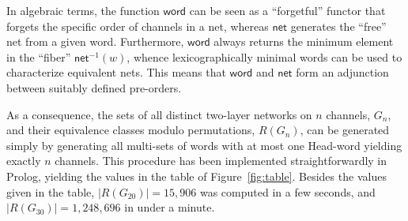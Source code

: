\documentclass[10pt]{IEEEtran}
\newcommand{\net}{\mathsf{net}}
\newcommand{\word}{\mathsf{word}}
\begin{document}
In algebraic terms, the function $\word$ can be seen as a
``forgetful'' functor that forgets the specific order of channels in a
net, whereas $\net$ generates the ``free'' net from a given word.
Furthermore, $\word$ always returns the minimum element in the ``fiber''
$\net^{-1}(w)$, whence lexicographically minimal words can be used to
characterize equivalent nets.  This means that $\word$ and $\net$ form
an adjunction between suitably defined pre-orders.

As a consequence, the sets of all distinct two-layer networks
on $n$ channels, $G_n$, and their equivalence classes modulo
permutations, $R(G_n)$, can be generated simply by generating all multi-sets of
words with at most one Head-word yielding exactly $n$ channels.  This
procedure has been implemented straightforwardly in Prolog, yielding
the values in the table of Figure~\ref{fig:table}. Besides the values
given in the table, $|R(G_{20})|=15{,}906$ was computed in a few
seconds, and $|R(G_{30})|=1{,}248{,}696$ in under a minute.
\end{document}
